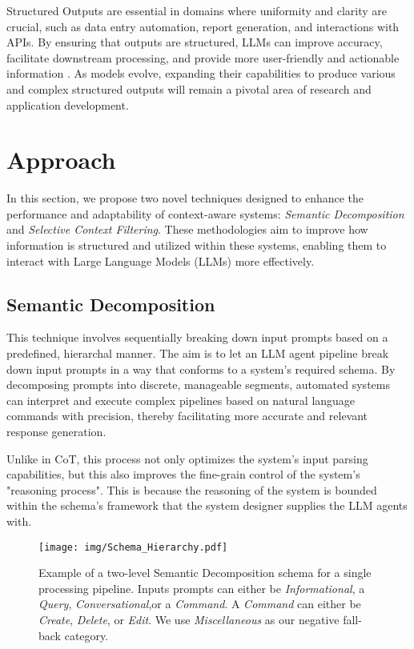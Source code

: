 Structured Outputs are essential in domains where uniformity and clarity are crucial, such as data entry automation, report generation, and interactions with APIs. By ensuring that outputs are structured, LLMs can improve accuracy, facilitate downstream processing, and provide more user-friendly and actionable information \cite{liuWeNeedStructured2024}. As models evolve, expanding their capabilities to produce various and complex structured outputs will remain a pivotal area of research and application development.

\section{Approach}

In this section, we propose two novel techniques designed to enhance the performance and adaptability of context-aware systems: \textit{Semantic Decomposition} and \textit{Selective Context Filtering}. These methodologies aim to improve how information is structured and utilized within these systems, enabling them to interact with Large Language Models (LLMs) more effectively.

\subsection{Semantic Decomposition}

This technique involves sequentially breaking down input prompts based on a predefined, hierarchal manner. The aim is to let an LLM agent pipeline break down input prompts in a way that conforms to a system's required schema. By decomposing prompts into discrete, manageable segments, automated systems can interpret and execute complex pipelines based on natural language commands with precision, thereby facilitating more accurate and relevant response generation.

Unlike in CoT, this process not only optimizes the system's input parsing capabilities, but this also improves the fine-grain control of the system's "reasoning process". This is because the reasoning of the system is bounded within the schema's framework that the system designer supplies the LLM agents with. 

\begin{figure}[h]
\centering
\texttt{[image: img/Schema\_Hierarchy.pdf]}
\caption{Example of a two-level Semantic Decomposition schema for a single processing pipeline. Inputs prompts can either be \textit{Informational}, a \textit{Query}, \textit{Conversational},or a \textit{Command}. A \textit{Command} can either be \textit{Create}, \textit{Delete}, or \textit{Edit}. We use \textit{Miscellaneous} as our negative fall-back category. }
\end{figure}

